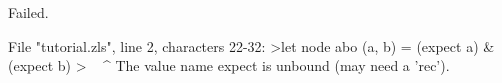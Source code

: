 \runverbatimfalse
{}
\begin{RunVerbatimMsg}
Failed.
\end{RunVerbatimMsg}
\begin{RunVerbatimErr}
File "tutorial.zls", line 2, characters 22-32:
>let node abo (a, b) = (expect a) & (expect b)
>                      ^^^^^^^^^^
The value name expect is unbound (may need a 'rec').
\end{RunVerbatimErr}
